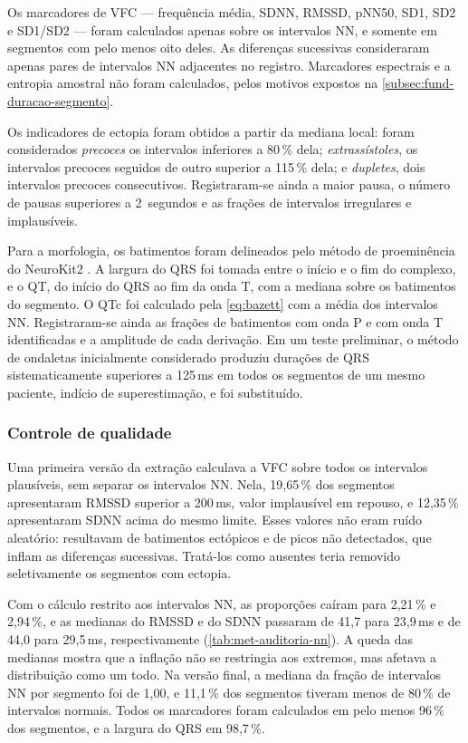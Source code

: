 Os marcadores de \gls{VFC} --- frequência média, SDNN, RMSSD, pNN50, SD1,
SD2 e SD1/SD2 --- foram calculados apenas sobre os intervalos NN, e somente
em segmentos com pelo menos oito deles. As diferenças sucessivas
consideraram apenas pares de intervalos NN adjacentes no registro.
Marcadores espectrais e a entropia amostral não foram calculados, pelos
motivos expostos na \autoref{subsec:fund-duracao-segmento}.

Os indicadores de ectopia foram obtidos a partir da mediana local: foram
considerados \textit{precoces} os intervalos inferiores a 80\,\% dela;
\textit{extrassístoles}, os intervalos precoces seguidos de outro superior a
115\,\% dela; e \textit{dupletes}, dois intervalos precoces consecutivos.
Registraram-se ainda a maior pausa, o número de pausas superiores a
2~segundos e as frações de intervalos irregulares e implausíveis.

Para a morfologia, os batimentos foram delineados pelo método de
proeminência do NeuroKit2 \cite{makowski2021neurokit2}. A largura do QRS foi tomada
entre o início e o fim do complexo, e o QT, do início do QRS ao fim da onda
T, com a mediana sobre os batimentos do segmento. O QTc foi calculado pela
\autoref{eq:bazett} com a média dos intervalos NN. Registraram-se ainda as
frações de batimentos com onda P e com onda T identificadas e a amplitude
de cada derivação. Em um teste preliminar, o método de ondaletas
inicialmente considerado produziu durações de QRS sistematicamente
superiores a 125\,ms em todos os segmentos de um mesmo paciente, indício de
superestimação, e foi substituído.

\subsubsection{Controle de qualidade}

Uma primeira versão da extração calculava a \gls{VFC} sobre todos os
intervalos plausíveis, sem separar os intervalos NN. Nela, 19,65\,\% dos
segmentos apresentaram RMSSD superior a 200\,ms, valor implausível em
repouso, e 12,35\,\% apresentaram SDNN acima do mesmo limite. Esses valores
não eram ruído aleatório: resultavam de batimentos ectópicos e de picos não
detectados, que inflam as diferenças sucessivas. Tratá-los como ausentes
teria removido seletivamente os segmentos com ectopia.

Com o cálculo restrito aos intervalos NN, as proporções caíram para
2,21\,\% e 2,94\,\%, e as medianas do RMSSD e do SDNN passaram de 41,7 para
23,9\,ms e de 44,0 para 29,5\,ms, respectivamente
(\autoref{tab:met-auditoria-nn}). A queda das medianas mostra que a
inflação não se restringia aos extremos, mas afetava a distribuição como um
todo. Na versão final, a mediana da fração de intervalos NN por segmento foi
de 1,00, e 11,1\,\% dos segmentos tiveram menos de 80\,\% de intervalos
normais. Todos os marcadores foram calculados em pelo menos 96\,\% dos
segmentos, e a largura do QRS em 98,7\,\%.

